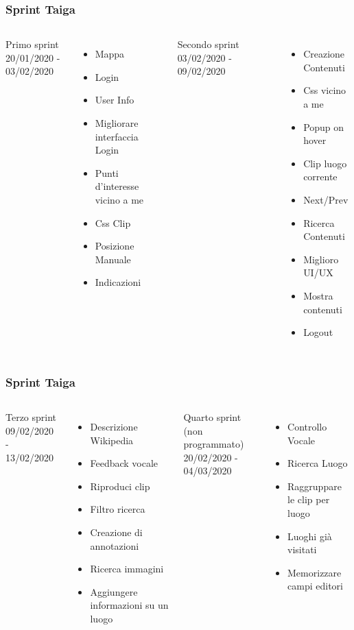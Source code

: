 \documentclass{beamer}
\begin{document}
\begin{frame}
\frametitle{Sprint Taiga}
\begin{columns}
Primo sprint\\
20/01/2020 - 03/02/2020
  \begin{itemize}
	\item Mappa
	\item Login
	\item User Info
	\item Migliorare interfaccia Login
	\item Punti d'interesse vicino a me
	\item Css Clip
	\item Posizione Manuale
	\item Indicazioni
  \end{itemize}
  Secondo sprint
03/02/2020 - 09/02/2020
  \begin{itemize}
	\item Creazione Contenuti
	\item Css vicino a me
	\item Popup on hover
	\item Clip luogo corrente
	\item Next/Prev
	\item Ricerca Contenuti
	\item Miglioro UI/UX
	\item Mostra contenuti
	\item Logout
  \end{itemize}
\end{columns}
\end{frame}

\begin{frame}
\frametitle{Sprint Taiga}
\begin{columns}
Terzo sprint\\
09/02/2020 - 13/02/2020
  \begin{itemize}
	\item Descrizione Wikipedia
	\item Feedback vocale
	\item Riproduci clip
	\item Filtro ricerca
	\item Creazione di annotazioni
	\item Ricerca immagini
	\item Aggiungere informazioni su un luogo
  \end{itemize}
  Quarto sprint (non programmato)\\
20/02/2020 - 04/03/2020
  \begin{itemize}
	\item Controllo Vocale
	\item Ricerca Luogo
	\item Raggruppare le clip per luogo
	\item Luoghi già visitati
	\item Memorizzare campi editori
  \end{itemize}
\end{columns}
\end{frame}
\end{document}
